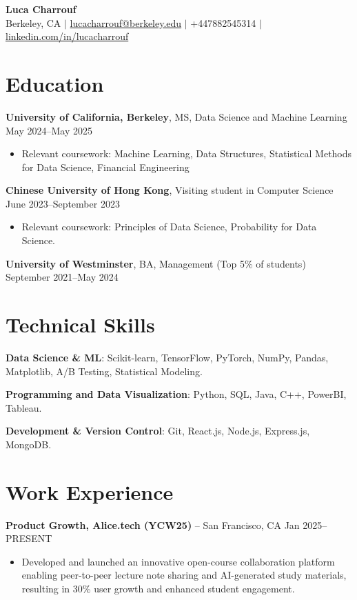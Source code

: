 \documentclass{article}
\begin{document}
\begin{center}
    \textbf{\Large Luca Charrouf}\\
    \vspace{0.1cm}
    Berkeley, CA $|$ \href{mailto:lucacharrouf@berkeley.edu}{lucacharrouf@berkeley.edu} $|$ +447882545314 $|$ \href{https://linkedin.com/in/lucacharrouf}{linkedin.com/in/lucacharrouf}
\end{center}

\section*{Education}

\textbf{University of California, Berkeley}, MS, Data Science and Machine Learning \hfill May 2024--May 2025
\begin{itemize}[leftmargin=*, noitemsep]
    \item Relevant coursework: Machine Learning, Data Structures, Statistical Methods for Data Science, Financial Engineering
\end{itemize}

\textbf{Chinese University of Hong Kong}, Visiting student in Computer Science \hfill June 2023--September 2023
\begin{itemize}[leftmargin=*, noitemsep]
    \item Relevant coursework: Principles of Data Science, Probability for Data Science.
\end{itemize}

\textbf{University of Westminster}, BA, Management (Top 5\% of students) \hfill September 2021--May 2024

\section*{Technical Skills}

\textbf{Data Science \& ML}: Scikit-learn, TensorFlow, PyTorch, NumPy, Pandas, Matplotlib, A/B Testing, Statistical Modeling.

\textbf{Programming and Data Visualization}: Python, SQL, Java, C++, PowerBI, Tableau.

\textbf{Development \& Version Control}: Git, React.js, Node.js, Express.js, MongoDB.

\section*{Work Experience}

\textbf{Product Growth, Alice.tech (YCW25)} -- San Francisco, CA \hfill Jan 2025--PRESENT
\begin{itemize}[leftmargin=*, noitemsep]
    \item Developed and launched an innovative open-course collaboration platform enabling peer-to-peer lecture note sharing and AI-generated study materials, resulting in 30\% user growth and enhanced student engagement.
\end{itemize}
\end{document}
